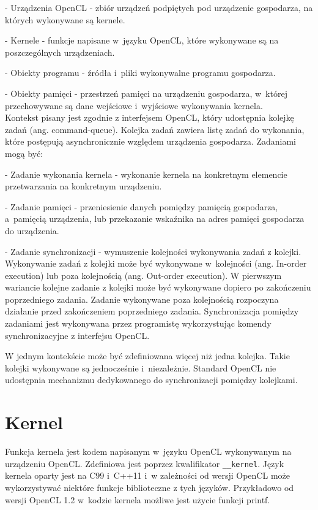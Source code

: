 - Urządzenia OpenCL - zbiór urządzeń podpiętych pod urządzenie gospodarza, na których wykonywane są kernele.

- Kernele - funkcje napisane w~języku OpenCL, które wykonywane są na poszczególnych urządzeniach.

- Obiekty programu - źródła i~pliki wykonywalne programu gospodarza.

- Obiekty pamięci - przestrzeń pamięci na urządzeniu gospodarza, w~której przechowywane są dane wejściowe i~wyjściowe wykonywania kernela.\\

Kontekst pisany jest zgodnie z interfejsem OpenCL, który udostępnia kolejkę zadań (ang. command-queue). Kolejka zadań zawiera listę zadań do wykonania, które postępują asynchronicznie względem urządzenia gospodarza. Zadaniami mogą być:

- Zadanie wykonania kernela - wykonanie kernela na konkretnym elemencie przetwarzania na konkretnym urządzeniu.

- Zadanie pamięci - przeniesienie danych pomiędzy pamięcią gospodarza, a~pamięcią urządzenia, lub przekazanie wskaźnika na adres pamięci gospodarza do urządzenia.

- Zadanie synchronizacji - wymuszenie kolejności wykonywania zadań z kolejki.\\

Wykonywanie zadań z kolejki może być wykonywane w~kolejności (ang. In-order execution) lub poza kolejnością (ang. Out-order execution). W pierwszym wariancie kolejne zadanie z kolejki może być wykonywane dopiero po zakończeniu poprzedniego zadania. Zadanie wykonywane poza kolejnością rozpoczyna działanie przed zakończeniem poprzedniego zadania. Synchronizacja pomiędzy zadaniami jest wykonywana przez programistę wykorzystując komendy synchronizacyjne z interfejsu OpenCL.

W jednym kontekście może być zdefiniowana więcej niż jedna kolejka. Takie kolejki wykonywane są jednocześnie i~niezależnie. Standard OpenCL nie udostępnia mechanizmu dedykowanego do synchronizacji pomiędzy kolejkami.


\section{Kernel}\label{sec:OpenC4L}

Funkcja kernela jest kodem napisanym w~języku OpenCL wykonywanym na urządzeniu OpenCL. Zdefiniowa jest poprzez kwalifikator \verb|__kernel|. Język kernela oparty jest na C99 i~C++11 i~w zależności od wersji OpenCL może wykorzystywać niektóre funkcje biblioteczne z tych języków. Przykładowo od wersji OpenCL 1.2 w~kodzie kernela możliwe jest użycie funkcji printf.


